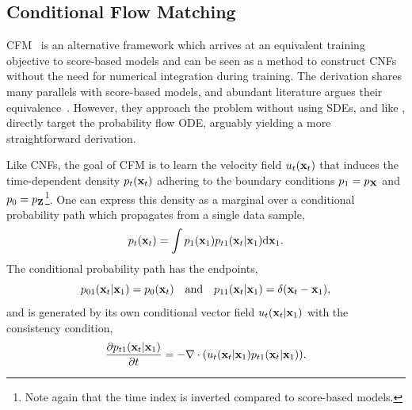 \subsection{Conditional Flow Matching}
\label{sec:cfm}

\Gls{CFM}~\cite{BuildingNormalizingFlows, FlowMatchingGenerative, FlowStraightFast} is an alternative framework which arrives at an equivalent training objective to score-based models and can be seen as a method to construct \Glspl{CNF} without the need for numerical integration during training.
The derivation shares many parallels with score-based models, and abundant literature argues their equivalence~\cite{CM2, StochasticInterpolants}.
However, they approach the problem without using \Glspl{SDE}, and like \textcite{ElucidatingDesignSpace}, directly target the probability flow \Gls{ODE}, arguably yielding a more straightforward derivation.

Like \Glspl{CNF}, the goal of \Gls{CFM} is to learn the velocity field $u_t(\mathbf{x}_t)$ that induces the time-dependent density $p_t(\mathbf{x}_t)$ adhering to the boundary conditions $p_1 = p_{\mathbf{X}}$ and $p_0 = p_{\mathbf{Z}}$\footnote{Note again that the time index is inverted compared to score-based models.}.
One can express this density as a marginal over a conditional probability path which propagates from a single data sample,
\begin{equation}
    \label{eq:conditional_path}
    p_t(\mathbf{x}_t) = \int p_1(\mathbf{x}_1) p_{t1}(\mathbf{x}_t|\mathbf{x}_1) \mathrm{d} \mathbf{x}_1.
\end{equation}
The conditional probability path has the endpoints,
\begin{equation}
    \label{eq:conditional_path_endpoints}
    p_{01}(\mathbf{x}_t|\mathbf{x}_1) = p_0(\mathbf{x}_t) \quad \text{and} \quad p_{11}(\mathbf{x}_t|\mathbf{x}_1) = \delta(\mathbf{x}_t - \mathbf{x}_1),
\end{equation}
and is generated by its own conditional vector field $u_t(\mathbf{x}_t | \mathbf{x}_1)$ with the consistency condition,
\begin{equation}
    \label{eq:conditional_consistency}
    \frac{\partial p_{t1}(\mathbf{x}_t | \mathbf{x}_1)}{\partial t} = -\nabla \cdot (u_t(\mathbf{x}_t | \mathbf{x}_1) p_{t1}(\mathbf{x}_t | \mathbf{x}_1)).
\end{equation}

